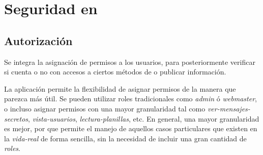 \section{Seguridad en \eframeworkAF}







\subsection{Autorización}


Se integra la asignación de permisos a los usuarios, para posteriormente verificar si cuenta o no con accesos a ciertos métodos de \meteorNAME o publicar información.

La aplicación permite la flexibilidad de asignar permisos de la manera que parezca más útil. Se pueden utilizar roles tradicionales como \textit{admin} ó \textit{webmaster}, o incluso asignar permisos con una mayor granularidad tal como \textit{ver-mensajes-secretos}, \textit{vista-usuarios}, \textit{lectura-planillas}, etc. En general, una mayor granularidad es mejor, por que permite el manejo de aquellos casos particulares que existen en la \textit{vida-real} de forma sencilla, sin la necesidad de incluir una gran cantidad de \textit{roles}.


